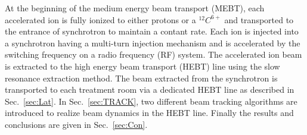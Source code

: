 \documentclass[jkps,preprint,fleqn,showpacs,showkeys,10pt,twocolumn]{revtex4}
\begin{document}
At the beginning of the medium energy beam transport (MEBT), each accelerated ion is fully ionized to either protons or a $^{12}C^{6+}$ 
and transported to the entrance of synchrotron to maintain a contant rate. 
Each ion is injected into a synchrotron having a multi-turn injection mechanism and is accelerated by the switching frequency on a radio frequency (RF) system. 
The accelerated ion beam is extracted to the high energy beam transport (HEBT) line using the slow resonance extraction method\cite{Extract,HJYim,Chawon}.
The beam extracted from the synchrotron is transported to each treatment room via a dedicated HEBT line as described in Sec.~\ref{sec:Lat}.
In Sec.~\ref{sec:TRACK}, two different beam tracking algorithms are introduced to realize beam dynamics in the HEBT line.
Finally the results and conclusions are given in Sec.~\ref{sec:Con}.
\end{document}
